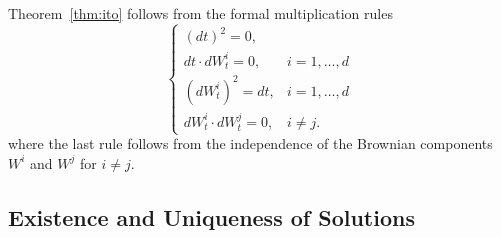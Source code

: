 \begin{remark}
Theorem~\ref{thm:ito} follows from the formal multiplication rules
\begin{equation}
\begin{cases}
    (dt)^2 = 0,\\
    dt \cdot dW^i_t = 0,  & i=1,\ldots,d\\
    (dW^i_t)^2 = dt, & i=1,\ldots,d\\
    dW^i_t \cdot dW^j_t = 0, & i\neq j.
\end{cases}
\end{equation}
where the last rule follows from the independence of the Brownian components $W^i$ and $W^j$ for $i\neq j$.
\label{rem:multitable}
\end{remark}




\subsection{Existence and Uniqueness of Solutions}

